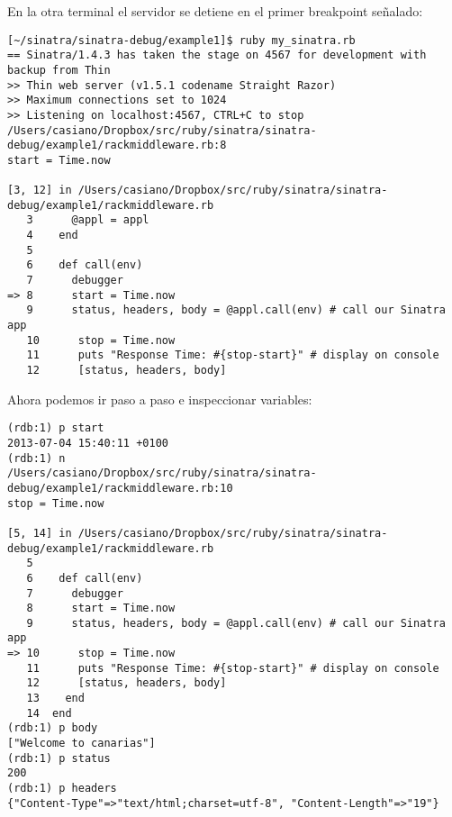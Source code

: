 En la otra terminal el servidor se detiene en el primer breakpoint señalado:
\begin{verbatim}
[~/sinatra/sinatra-debug/example1]$ ruby my_sinatra.rb 
== Sinatra/1.4.3 has taken the stage on 4567 for development with backup from Thin
>> Thin web server (v1.5.1 codename Straight Razor)
>> Maximum connections set to 1024
>> Listening on localhost:4567, CTRL+C to stop
/Users/casiano/Dropbox/src/ruby/sinatra/sinatra-debug/example1/rackmiddleware.rb:8
start = Time.now

[3, 12] in /Users/casiano/Dropbox/src/ruby/sinatra/sinatra-debug/example1/rackmiddleware.rb
   3      @appl = appl
   4    end
   5  
   6    def call(env)
   7      debugger
=> 8      start = Time.now
   9      status, headers, body = @appl.call(env) # call our Sinatra app
   10      stop = Time.now
   11      puts "Response Time: #{stop-start}" # display on console
   12      [status, headers, body]
\end{verbatim}

Ahora podemos ir paso a paso e inspeccionar variables:
\begin{verbatim}
(rdb:1) p start
2013-07-04 15:40:11 +0100
(rdb:1) n
/Users/casiano/Dropbox/src/ruby/sinatra/sinatra-debug/example1/rackmiddleware.rb:10
stop = Time.now

[5, 14] in /Users/casiano/Dropbox/src/ruby/sinatra/sinatra-debug/example1/rackmiddleware.rb
   5  
   6    def call(env)
   7      debugger
   8      start = Time.now
   9      status, headers, body = @appl.call(env) # call our Sinatra app
=> 10      stop = Time.now
   11      puts "Response Time: #{stop-start}" # display on console
   12      [status, headers, body]
   13    end
   14  end
(rdb:1) p body
["Welcome to canarias"]
(rdb:1) p status
200
(rdb:1) p headers
{"Content-Type"=>"text/html;charset=utf-8", "Content-Length"=>"19"}
\end{verbatim}


